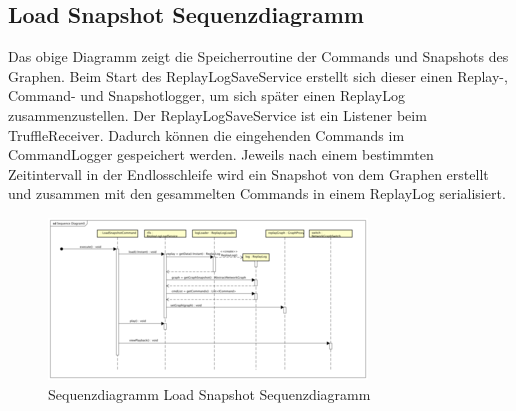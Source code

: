 \subsection{Load Snapshot Sequenzdiagramm}

Das obige Diagramm zeigt die Speicherroutine der Commands und Snapshots des Graphen. Beim Start des ReplayLogSaveService erstellt sich dieser einen Replay-, Command- und Snapshotlogger, um sich später einen ReplayLog zusammenzustellen. Der ReplayLogSaveService ist ein Listener beim TruffleReceiver. Dadurch können die eingehenden Commands im CommandLogger gespeichert werden. Jeweils nach einem bestimmten Zeitintervall in der Endlosschleife wird ein Snapshot von dem Graphen erstellt und zusammen mit den gesammelten Commands in einem ReplayLog serialisiert.

\begin{figure}
  \centering
  \includegraphics[width=\textwidth]{../diagramimages/sd_loadsnapshot.png}
  \caption[Sequenzdiagramm Load Snapshot Sequenzdiagramm]{Sequenzdiagramm Load Snapshot Sequenzdiagramm}
\end{figure}
\FloatBarrier
